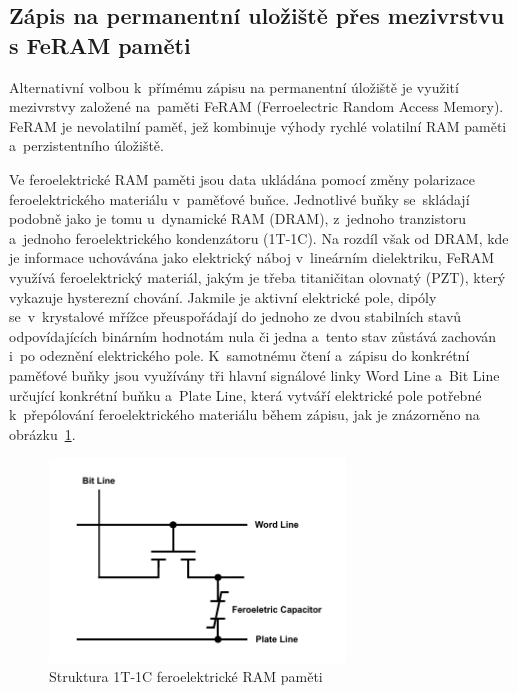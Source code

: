 \subsection{Zápis na permanentní uložiště přes mezivrstvu s FeRAM paměti}
Alternativní volbou k~přímému zápisu na permanentní úložiště je využití mezivrstvy založené na~paměti FeRAM (Ferroelectric Random Access Memory). FeRAM je nevolatilní paměť, jež kombinuje výhody rychlé volatilní RAM paměti a~perzistentního úložiště.

Ve feroelektrické RAM paměti jsou data ukládána pomocí změny polarizace feroelektrického materiálu v~paměťové buňce. Jednotlivé buňky se~skládají podobně jako je tomu u~dynamické RAM (DRAM), z~jednoho tranzistoru a~jednoho feroelektrického kondenzátoru (1T-1C). Na rozdíl však od DRAM, kde je informace uchovávána jako elektrický náboj v~lineárním dielektriku, FeRAM využívá feroelektrický materiál, jakým je třeba titaničitan olovnatý (PZT), který vykazuje hysterezní chování. Jakmile je aktivní elektrické pole, dipóly se~v~krystalové mřížce přeuspořádají do jednoho ze dvou stabilních stavů odpovídajících binárním hodnotám nula či jedna a~tento stav zůstává zachován i~po odeznění elektrického pole. K~samotnému čtení a~zápisu do konkrétní paměťové buňky jsou využívány tři hlavní signálové linky Word Line a~Bit Line určující konkrétní buňku a~Plate Line, která vytváří elektrické pole potřebné k~přepólování feroelektrického materiálu během zápisu, jak je znázorněno na obrázku~\ref{fig:feram-1t-1c}.~\cite{ieee_feram_ultra_high_density_embedded_mem}

\begin{figure}[h]
    \centering
    \includegraphics[width=0.70\textwidth]{obrazky-figures/fram_t1-c1.pdf}
    
    \caption{Struktura 1T-1C feroelektrické RAM paměti~\cite{ieee_feram_ultra_high_density_embedded_mem}}
    \label{fig:feram-1t-1c}
\end{figure}

